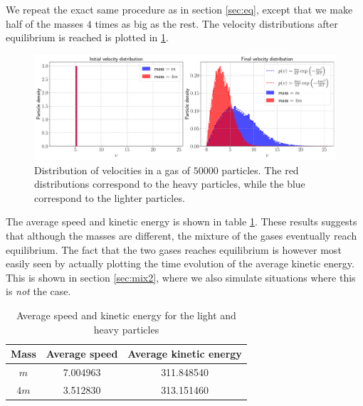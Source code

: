 We repeat the exact same procedure as in section \ref{sec:eq}, except that we make half of the masses $4$ times as big as the rest. The velocity distributions after equilibrium is reached is plotted in \ref{fig:dist_3}.

\begin{figure}[htb]
	\centering
	\includegraphics[width=\textwidth]{../fig/distribution_2}
	\caption{Distribution of velocities in a gas of $50000$ particles. The red distributions correspond to the heavy particles, while the blue correspond to the lighter particles.}
	\label{fig:dist_3}
\end{figure}

The average speed and kinetic energy is shown in table \ref{tab:averages}. These results suggests that although the masses are different, the mixture of the gases eventually reach equilibrium. The fact that the two gases reaches equilibrium is however most easily seen by actually plotting the time evolution of the average kinetic energy. This is shown in section \ref{sec:mix2}, where we also simulate situations where this is \textit{not} the case.

\begin{table}[htb]
	\centering 
	\caption{Average speed and kinetic energy for the light and heavy particles}
	\begin{tabular}{ccc}
		\hline
		\textbf{Mass }& \textbf{Average speed} & \textbf{Average kinetic energy} \\
		\hline 
		$m$   & 7.004963 & 311.848540 \\
		$4m$  & 3.512830 & 313.151460 \\
		\hline 
	\end{tabular}
	\label{tab:averages}
\end{table}
